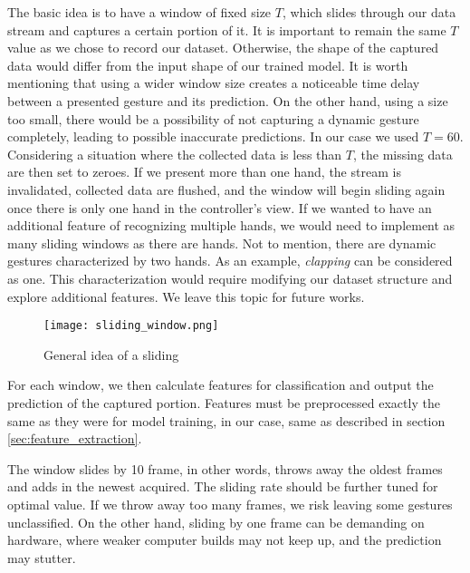 The basic idea is to have a window of fixed size $T$, which slides through our data stream and captures a certain portion of it. It is important to remain the same $T$ value as we chose to record our dataset. Otherwise, the shape of the captured data would differ from the input shape of our trained model. It is worth mentioning that using a wider window size creates a noticeable time delay between a presented gesture and its prediction. On the other hand, using a size too small, there would be a possibility of not capturing a dynamic gesture completely, leading to possible inaccurate predictions. In our case we used $T = 60$. Considering a situation where the collected data is less than $T$, the missing data are then set to zeroes. If we present more than one hand, the stream is invalidated, collected data are flushed, and the window will begin sliding again once there is only one hand in the controller's view. If we wanted to have an additional feature of recognizing multiple hands, we would need to implement as many sliding windows as there are hands. Not to mention, there are dynamic gestures characterized by two hands. As an example, \textit{clapping} can be considered as one.  This characterization would require modifying our dataset structure and explore additional features. We leave this topic for future works.


\begin{figure}[ht]
    \centering
    \texttt{[image: sliding\_window.png]}
    \caption{General idea of a sliding \cite{sliding_window_img}}
    \label{fig:sliding_window}
\end{figure}

For each window, we then calculate features for classification and output the prediction of the captured portion. Features must be preprocessed exactly the same as they were for model training, in our case, same as described in section \ref{sec:feature_extraction}. 

The window slides by 10 frame, in other words, throws away the oldest frames and adds in the newest acquired. The sliding rate should be further tuned for optimal value. If we throw away too many frames, we risk leaving some gestures unclassified. On the other hand, sliding by one frame can be demanding on hardware, where weaker computer builds may not keep up, and the prediction may stutter.


